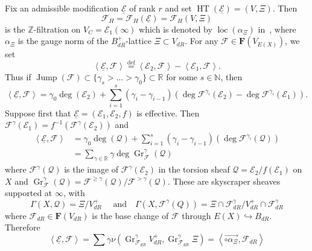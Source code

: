 \documentclass[11pt]{article}
\theoremstyle{definition}
\numberwithin{equation}{section}
\numberwithin{figure}{section}
\numberwithin{table}{section}
\DeclareMathOperator{\Gr}{Gr}
\DeclareMathOperator{\Jump}{Jump}
\DeclareMathOperator{\HTT}{HT}
\DeclareMathOperator{\loc}{loc}
\newcommand{\eqd}{\stackrel{\mathrm{def}}{=}}
\newcommand*{\dR}{dR}
\begin{document}
\subsubsection{}

Fix an admissible modification $\underline{\mathcal{E}}$ of rank $r$ and set $\HTT(\underline{\mathcal{E}})=\left(V,\Xi\right)$. Then
\[
\mathcal{F}_{H}=\mathcal{F}_{H}(\underline{\mathcal{E}})=\mathcal{F}_{H}(V,\Xi)
\]
is the $\mathbb{Z}$-filtration on $V_{C}=\mathcal{E}_{1}(\infty)$ which is denoted by $\loc(\alpha_{\Xi})$ in~\cite[6.4]{Co16}, where $\alpha_{\Xi}$ is the gauge norm of the $B_{\dR}^{+}$-lattice $\Xi\subset V_{\dR}$. For any $\mathcal{F}\in\mathbf{F}(V_{E(X)})$, we set
\[
\left\langle \underline{\mathcal{E}},\mathcal{F}\right\rangle \eqd\left\langle \mathcal{E}_{2},\mathcal{F}\right\rangle -\left\langle \mathcal{E}_{1},\mathcal{F}\right\rangle.
\]
Thus if $\Jump(\mathcal{F})\subset\{\gamma_{s}>\dots>\gamma_{0}\}\subset\mathbb{R}$ for some $s\in\mathbb{N}$, then
\[
\left\langle \underline{\mathcal{E}},\mathcal{F}\right\rangle =\gamma_{0}\deg(\mathcal{E}_{2})+\sum_{i=1}^{s}(\gamma_{i}-\gamma_{i-1})\left(\deg\mathcal{F}^{\gamma_{i}}(\mathcal{E}_{2})-\deg\mathcal{F}^{\gamma_{i}}(\mathcal{E}_{1})\right).
\]
Suppose first that $\underline{\mathcal{E}}=(\mathcal{E}_{1},\mathcal{E}_{2},f)$ is effective. Then $\mathcal{F}^{\gamma}(\mathcal{E}_{1})=f^{-1}(\mathcal{F}^{\gamma}(\mathcal{E}_{2}))$ and
\begin{align*}
\left\langle \underline{\mathcal{E}},\mathcal{F}\right\rangle & = \gamma_{0}\deg(\mathcal{Q})+\sum_{i=1}^{s}(\gamma_{i}-\gamma_{i-1})\left(\deg\mathcal{F}^{\gamma_{i}}(\mathcal{Q})\right)\\
& = \sum_{\gamma\in\mathbb{R}}\gamma\deg\Gr_{\mathcal{F}}^{\gamma}(\mathcal{Q})
\end{align*}
where $\mathcal{F}^{\gamma}(\mathcal{Q})$ is the image of $\mathcal{F}^{\gamma}(\mathcal{E}_{2})$ in the torsion sheaf $\mathcal{Q}=\mathcal{E}_{2}/f(\mathcal{E}_{1})$ on $X$ and $\Gr_{\mathcal{F}}^{\gamma}(\mathcal{Q})=\mathcal{F}^{\geq\gamma}(\mathcal{Q})/\mathcal{F}^{>\gamma}(\mathcal{Q})$. These are skyscraper sheaves supported at $\infty$, with
\[
\Gamma(X,\mathcal{Q})=\Xi/V_{\dR}^{+}\quad\text{ and}\quad\Gamma(X,\mathcal{F}^{\gamma}(Q))=\Xi\cap\mathcal{F}_{\dR}^{\gamma}/V_{\dR}^{+}\cap\mathcal{F}_{\dR}^{\gamma}
\]
where $\mathcal{F}_{\dR}\in\mathbf{F}(V_{\dR})$ is the base change of $\mathcal{F}$ through $E(X)\hookrightarrow B_{\dR}$. Therefore
\[
\left\langle \underline{\mathcal{E}},\mathcal{F}\right\rangle =\sum\gamma\nu\left(\Gr_{\mathcal{F}_{\dR}}^{\gamma}V_{\dR}^{+},\Gr_{\mathcal{F}_{\dR}}^{\gamma}\Xi\right)=\left\langle \overrightarrow{\circ\alpha_{\Xi}},\mathcal{F}_{\dR}\right\rangle
\]
\end{document}
